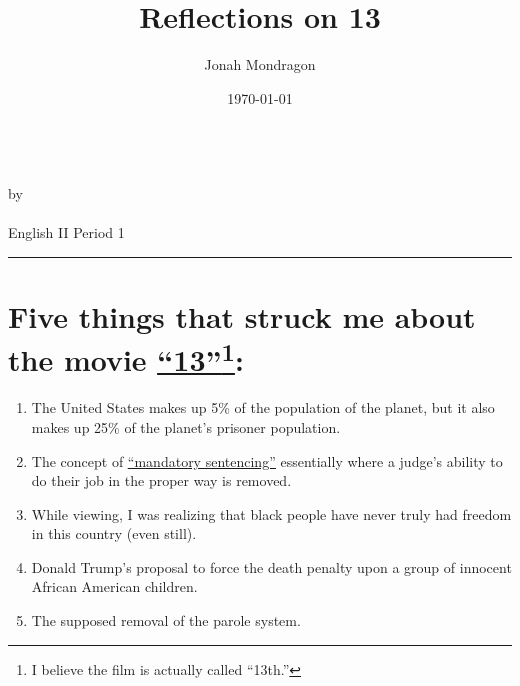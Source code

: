 \documentclass[12pt]{article}
\newcommand{\PutTitle}[1]
{
    \begin{center}
        {\huge\bfseries\thetitle}\\
        by \theauthor\\
        \thedate\\
        #1        
    \end{center}
    \hrule
    \vspace{2ex}
}
\begin{document}
\title{Reflections on 13}
\author{Jonah Mondragon}
\date{\today}
\PutTitle{English II Period 1}

\doublespacing

\section*{Five things that struck me about the movie
{\color{blue}\underline{\href{https://www.youtube.com/watch?v=krfcq5pF8u8}
{``13''}}}\footnote{I believe the film is actually called ``13th.''}:}
\begin{enumerate} \item{The United States makes up 5\% of the population of the
planet, but it also makes up 25\% of the planet's prisoner population.}
\item{The concept of {\color{blue}\underline{\href{
https://www.cjpf.org/mandatory-minimums}{``mandatory sentencing''}}} essentially
where a judge's ability to do their job in the proper way is removed.}
\item{While viewing, I was realizing that black people have never truly had
freedom in this country (even still).}

\item{Donald Trump's proposal to force the death penalty upon a group of
innocent African American children.}

\item{The supposed removal of the parole system.}

\end{enumerate}
\end{document}
